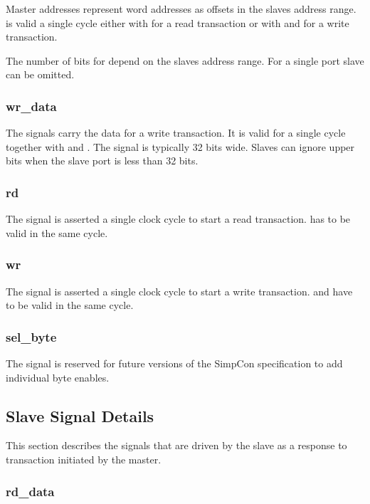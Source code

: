 Master addresses represent word addresses as offsets in the slaves
address range.  is valid a single cycle either with
 for a read transaction or with  and
 for a write transaction.

The number of bits for  depend on the slaves address
range. For a single port slave  can be omitted.

\subsubsection{wr\_data}

The  signals carry the data for a write transaction.
It is valid for a single cycle together with  and
. The signal is typically 32 bits wide. Slaves can ignore
upper bits when the slave port is less than 32 bits.

\subsubsection{rd}

The  signal is asserted a single clock cycle to start a
read transaction.  has to be valid in the same cycle.

\subsubsection{wr}

The  signal is asserted a single clock cycle to start a
write transaction.  and  have to be
valid in the same cycle.

\subsubsection{sel\_byte}

The  signal is reserved for future versions of the
SimpCon specification to add individual byte enables.

\subsection{Slave Signal Details}

This section describes the signals that are driven by the slave as a
response to transaction initiated by the master.

\subsubsection{rd\_data}

